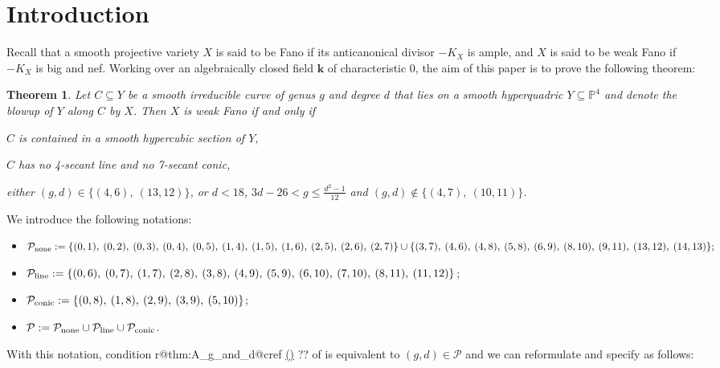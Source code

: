 \documentclass[english,11pt,reqno]{amsart}
\makeatletter
\newcommand{\sub}{\subseteq}
\newcommand{\Pfour}{\mathbb{P}^4}
\newcommand{\kk}{\mathbf{k}}
\newtheorem{mythm}{Theorem}
\newcounter{subcreftmpcnt} %
\newcommand\alphsubformat[1]{(\roman{#1})}
\newcommand\subcref[2][\alphsubformat]{%
	\ifcsname r@#2@cref\endcsname
	\cref@getcounter {#2}{\mylabel}%
	\setcounter{subcreftmpcnt}{\mylabel}%
	\hyperref[#2]{\alphsubformat{subcreftmpcnt}}%
	\else ?? \fi}
\makeatother
\begin{document}
	\section{Introduction} \label{section:introduction}
	Recall that a smooth projective variety $X$ is said to be Fano if its anticanonical divisor $-K_X$ is ample, and $X$ is said to be weak Fano if $-K_X$ is big and nef. Working over an algebraically closed field $\kk$ of characteristic 0, the aim of this paper is to prove the following theorem:
	\begin{mythm} \label{thm:A}
		Let $C \sub Y$ be a smooth irreducible curve of genus $g$ and degree $d$ that lies on a smooth hyperquadric $Y \sub \Pfour$ and denote the blowup of $Y$ along $C$ by $X$. Then $X$ is weak Fano if and only if
		\begin{enummythm} 
			\item $C$ is contained in a smooth hypercubic section of $Y$, \label{thm:A_hypercubic}
			\item $C$ has no 4-secant line and no 7-secant conic, \label{thm:A_secants}
			\item either $(g,d)\in \{(4,6),\:(13,12)\}$, or $d < 18$, $3d-26<g\leq\frac{d^2-1}{12}$ and $(g,d)\not \in \{(4,7),\:(10, 11)\}$. \label{thm:A_g_and_d}
		\end{enummythm}
	\end{mythm}
	We introduce the following notations:
	\begin{itemize}
		\item $\mathcal{P}_{\textup{none}}:=\{(0,1),\:(0,2),\:(0,3),\:(0,4),\:(0,5),\:(1,4),\:(1,5),\:(1,6),\:(2,5),\:(2,6),\:(2,7)\} \cup \{(3,7),\:(4,6),\:(4,8),\:(5,8),\:(6,9),\:(8,10),\: (9,11),\:(13,12),\:(14,13)\};$
		\item $\mathcal{P}_{\textup{line}}:=\{(0,6),\:(0,7),\:(1,7),\:(2,8),\:(3,8),\:(4,9),\: (5,9),\:(6,10),\:(7,10),\:(8,11),\: (11,12)\}$;
		\item $\mathcal{P}_{\textup{conic}}:= \{(0,8),\:(1,8),\:(2,9),\:(3,9),\:(5,10)\}$;
		\item $\mathcal{P}:=\mathcal{P}_{\textup{none}} \cup \mathcal{P}_{\textup{line}} \cup \mathcal{P}_{\textup{conic}}$.
	\end{itemize}
	With this notation, condition \subcref{thm:A_g_and_d} of  is equivalent to $(g,d)\in \mathcal{P}$ and we can reformulate and specify  as follows:
\end{document}
